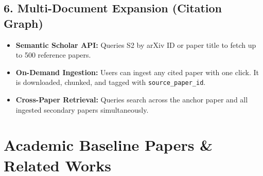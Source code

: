 \documentclass[10pt,a4paper]{article}
\begin{document}
\subsection{6. Multi-Document Expansion (Citation Graph)}
\begin{itemize}[leftmargin=1.5em]
    \item \textbf{Semantic Scholar API:} Queries S2 by arXiv ID or paper title to fetch up to 500 reference papers.
    \item \textbf{On-Demand Ingestion:} Users can ingest any cited paper with one click. It is downloaded, chunked, and tagged with \texttt{source\_paper\_id}.
    \item \textbf{Cross-Paper Retrieval:} Queries search across the anchor paper and all ingested secondary papers simultaneously.
\end{itemize}

\newpage

\section{Academic Baseline Papers \& Related Works}
\end{document}
